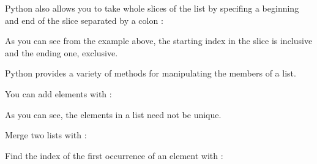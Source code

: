 Python also allows you to take whole slices of the list by specifing a
beginning and end of the slice separated by a colon \sphinxcode{:}:

\begin{sphinxVerbatim}[commandchars=\\\{\}]
\PYG{p}{[}\PYG{p}{]} 
\end{sphinxVerbatim}

As you can see from the example above, the starting index in the slice
is inclusive and the ending one, exclusive.

Python provides a variety of methods for manipulating the members of a
list.

You can add elements with :

\begin{sphinxVerbatim}[commandchars=\\\{\}]
\end{sphinxVerbatim}

As you can see, the elements in a list need not be unique.

Merge two lists with :

\begin{sphinxVerbatim}[commandchars=\\\{\}]
\PYG{p}{[} \PYG{p}{]}
\end{sphinxVerbatim}

Find the index of the first occurrence of an element with :

